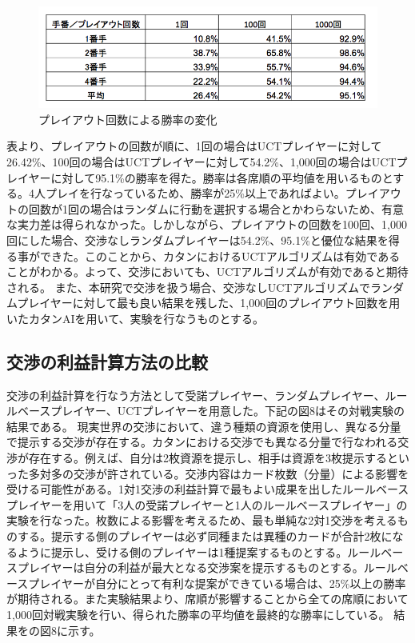 \documentclass[a4, 10pt,dvipdfmx]{jsarticle}
\begin{document}
\begin{figure}[b]
    \begin{center}
      \includegraphics[width=120mm]{img/playout.png}
    \end{center}
    \caption{プレイアウト回数による勝率の変化}
    \label{playout}
\end{figure}

表より、プレイアウトの回数が順に、1回の場合はUCTプレイヤーに対して26.42\%、100回の場合はUCTプレイヤーに対して54.2\%、1,000回の場合はUCTプレイヤーに対して95.1\%の勝率を得た。勝率は各席順の平均値を用いるものとする。4人プレイを行なっているため、勝率が25\%以上であればよい。プレイアウトの回数が1回の場合はランダムに行動を選択する場合とかわらないため、有意な実力差は得られなかった。しかしながら、プレイアウトの回数を100回、1,000回にした場合、交渉なしランダムプレイヤーは54.2\%、95.1\%と優位な結果を得る事ができた。このことから、カタンにおけるUCTアルゴリズムは有効であることがわかる。よって、交渉においても、UCTアルゴリズムが有効であると期待される。
また、本研究で交渉を扱う場合、交渉なしUCTアルゴリズムでランダムプレイヤーに対して最も良い結果を残した、1,000回のプレイアウト回数を用いたカタンAIを用いて、実験を行なうものとする。


\subsection{交渉の利益計算方法の比較}
交渉の利益計算を行なう方法として受諾プレイヤー、ランダムプレイヤー、ルールベースプレイヤー、UCTプレイヤーを用意した。下記の図8はその対戦実験の結果である。
現実世界の交渉において、違う種類の資源を使用し、異なる分量で提示する交渉が存在する。カタンにおける交渉でも異なる分量で行なわれる交渉が存在する。例えば、自分は2枚資源を提示し、相手は資源を3枚提示するといった多対多の交渉が許されている。交渉内容はカード枚数（分量）による影響を受ける可能性がある。1対1交渉の利益計算で最もよい成果を出したルールベースプレイヤーを用いて「3人の受諾プレイヤーと1人のルールベースプレイヤー」の実験を行なった。枚数による影響を考えるため、最も単純な2対1交渉を考えるものする。提示する側のプレイヤーは必ず同種または異種のカードが合計2枚になるように提示し、受ける側のプレイヤーは1種提案するものとする。ルールベースプレイヤーは自分の利益が最大となる交渉案を提示するものとする。ルールベースプレイヤーが自分にとって有利な提案ができている場合は、25\%以上の勝率が期待される。また実験結果より、席順が影響することから全ての席順において1,000回対戦実験を行い、得られた勝率の平均値を最終的な勝率にしている。
結果をの図8に示す。
\end{document}
